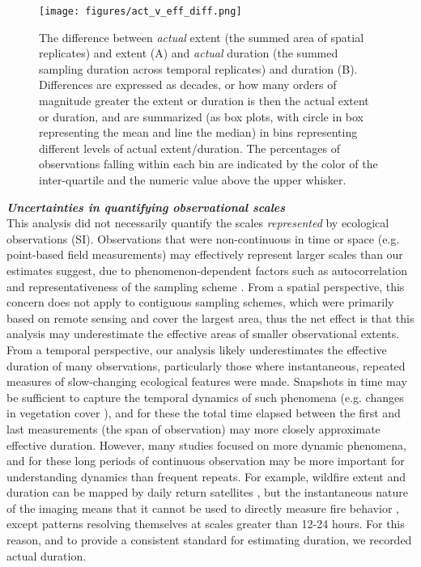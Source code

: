 \documentclass[12pt]{article}
\begin{document}
\begin{figure}[ht]
\texttt{[image: figures/act\_v\_eff\_diff.png]}
\vspace{-0.2 cm}
\caption{The difference between \emph{actual} extent (the summed area of spatial replicates) and extent (A) and \emph{actual} duration (the summed sampling duration across temporal replicates) and duration (B).  Differences are expressed as decades, or how many orders of magnitude greater the extent or duration is then the actual extent or duration, and are summarized (as box plots, with circle in box representing the mean and line the median) in bins representing different levels of actual extent/duration.  The percentages of observations falling within each bin are indicated by the color of the inter-quartile and the numeric value above the upper whisker.}
\label{afoto1}
\end{figure}

\noindent \textbf{\emph{Uncertainties in quantifying observational scales}}\\
This analysis did not necessarily quantify the scales \emph{represented} by ecological observations (SI). Observations that were non-continuous in time or space (e.g. point-based field measurements) may effectively represent larger scales than our estimates suggest, due to phenomenon-dependent factors such as autocorrelation and representativeness of the sampling scheme \cite{underwood_experiments_1997, palmer_scale_1994,cao_comparison_2002, legendre_spatial_1993,collins_method_2000-1}. From a spatial perspective, this concern does not apply to contiguous sampling schemes, which were primarily based on remote sensing and cover the largest area, thus the net effect is that this analysis may underestimate the effective areas of smaller observational extents. From a temporal perspective, our analysis likely underestimates the effective duration of many observations, particularly those where instantaneous, repeated measures of slow-changing ecological features were made. Snapshots in time may be sufficient to capture the temporal dynamics of such phenomena (e.g. changes in vegetation cover \cite{hansen_high-resolution_2013}), and for these the total time elapsed between the first and last measurements (the span of observation) may more closely approximate effective duration. However, many studies focused on more dynamic phenomena, and for these long periods of continuous observation may be more important for understanding dynamics than frequent repeats. For example, wildfire extent and duration can be mapped by daily return satellites \cite{roy_prototyping_2005,jones_fire_2009}, but the instantaneous nature of the imaging means that it cannot be used to directly measure fire behavior \cite{clements_observing_2007}, except patterns resolving themselves at scales greater than 12-24 hours. For this reason, and to provide a consistent standard for estimating duration, we recorded actual duration. 
\end{document}

